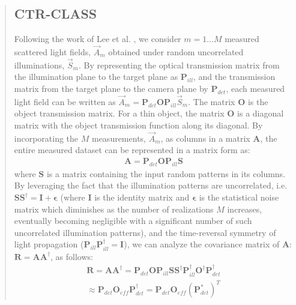 \documentclass[12pt]{article}
\newenvironment{ourresponse}
    {\begin{tcolorbox}[width=\linewidth,breakable,enhanced,colback=gray!5,colframe=responsecolor!50,title=Response,left=5pt,right=5pt]}
    {\end{tcolorbox}}
\begin{document}
\begin{enumerate}[label=\arabic*.]
\begin{ourresponse}
\begin{quote}
            \subsection{CTR-CLASS}
            Following the work of Lee et al. \cite{lee22}, we consider $m=1...M$ measured scattered light fields, $\vec{A}_m$ obtained under random uncorrelated illuminations, $\vec{S}_m$. By representing the optical transmission matrix from the illumination plane to the target plane as $\bm{P}_{ill}$, and the transmission matrix from the target plane to the camera plane by $\bm{P}_{det}$, each measured light field can be written as $\vec{A}_m = \bm{P}_{det}\bm{O} \bm{P}_{ill} \vec{S}_m$. The matrix $\bm{O}$ is the object transmission matrix. For a thin object, the matrix $\bm{O}$ is a diagonal matrix with the object transmission function along its diagonal.
            By incorporating the $M$ measurements, $\vec{A}_m$, as columns in a matrix $\bm{A}$, the entire measured dataset can be represented in a matrix form as:
            \begin{eqnarray}
            \bm{A} = \bm{P}_{det}\bm{O} \bm{P}_{ill} \bm{S}
            \label{eq:1}
            \end{eqnarray}
            where $\bm{S}$ is a matrix containing the input random patterns in its columns. By leveraging the fact that the illumination patterns are uncorrelated, i.e. $\bm{S}\bm{S}^\dagger = \bm{I + \epsilon}$ (where $\bm{I}$ is the identity matrix and $\bm{\epsilon}$ is the statistical noise matrix which diminishes as the number of realizations $M$ increases, eventually becoming negligible with a significant number of such uncorrelated illumination patterns), and the time-reversal symmetry of light propagation ($\bm{P}_{ill}\bm{P}_{ill}^{\dagger}=\bm{I}$), we can analyze the covariance matrix of $\bm{A}$: $\bm{R}=\bm{A}\bm{A}^{\dagger}$, as follows:
            \begin{eqnarray}
            \bm{R}=\bm{A}\bm{A}^\dagger = \bm{P}_{det}\bm{O}\bm{P}_{ill}\bm{S} \bm{S}^\dagger\bm{P}_{ill}^{\dagger} \bm{O}^\dagger \bm{P}^\dagger_{det} \nonumber \\ \approx \bm{P}_{det}\bm{O}_{eff} \bm{P}^\dagger_{det} = \bm{P}_{det}\bm{O}_{eff} (\bm{P}^{*}_{det})^T
            \label{eq:2}
            \end{eqnarray}
            

\end{quote}
\end{ourresponse}
\end{enumerate}
\end{document}
